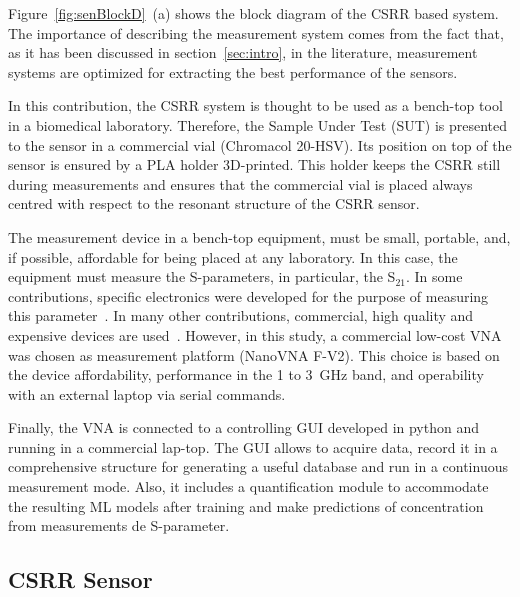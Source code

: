 \documentclass[journal,twoside,web]{ieeecolor}
\begin{document}
Figure~\ref{fig:senBlockD}~(a) shows the block diagram of the CSRR based system. The importance of describing the measurement system comes from the fact that, as it has been discussed in section~\ref{sec:intro}, in the literature, measurement systems are optimized for extracting the best performance of the sensors. 

In this contribution, the CSRR system is thought to be used as a bench-top tool in a biomedical laboratory. Therefore, the Sample Under Test (SUT) is presented to the sensor in a commercial vial (Chromacol 20-HSV). Its position on top of the sensor is ensured by a PLA holder 3D-printed. This holder keeps the CSRR still during measurements and ensures that the commercial vial is placed always centred with respect to the resonant structure of the CSRR sensor. 

The measurement device in a bench-top equipment, must be small, portable, and, if possible, affordable for being placed at any laboratory. In this case, the equipment must measure the S-parameters, in particular, the S$_{21}$. In some contributions, specific electronics were developed for the purpose of measuring this parameter~\cite{Omer2020, Omer2021}. In many other contributions, commercial, high quality and expensive devices are used~\cite{Patel2022, Jiang2023, Liu2024}. However, in this study, a commercial low-cost VNA was chosen as measurement platform (NanoVNA F-V2). This choice is based on the device  affordability, performance in the 1 to 3~GHz band, and operability with an external laptop via serial commands.

Finally, the VNA is connected to a controlling GUI developed in python and running in a commercial lap-top. The GUI allows to acquire data, record it in a comprehensive structure for generating a useful database and run in a continuous measurement mode. Also, it includes a quantification module to accommodate the resulting ML models after training and make predictions of concentration from measurements de S-parameter.   
\subsection{CSRR Sensor}
\label{ssec:csrrSensor}
\end{document}
